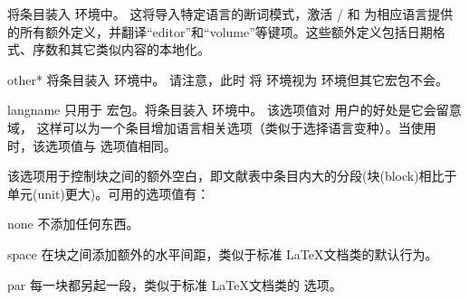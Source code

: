 \begin{optionlist}
\begin{valuelist}
将条目装入  环境中。
这将导入特定语言的断词模式，激活 / 和 \biblatex 为相应语言提供的所有额外定义，并翻译“editor”和“volume”等键项。这些额外定义包括日期格式、序数和其它类似内容的本地化。

\item[other*]
将条目装入  环境中。
请注意，此时 \biblatex 将  环境视为  环境但其它宏包不会。

\item[langname]
只用于  宏包。将条目装入  环境中。
该选项值对  用户的好处是它会留意  域，
这样可以为一个条目增加语言相关选项（类似于选择语言变种）。当使用  时，该选项值与  选项值相同。

\end{valuelist}


该选项用于控制块之间的额外空白，即文献表中条目内大的分段(块(block)相比于单元(unit)更大)。可用的选项值有：

\begin{valuelist}

\item[none] %
不添加任何东西。

\item[space] %
在块之间添加额外的水平间距，类似于标准 \LaTeX 文档类的默认行为。

\item[par] %
每一块都另起一段，类似于标准 \LaTeX 文档类的  选项。


\end{valuelist}
\end{optionlist}
